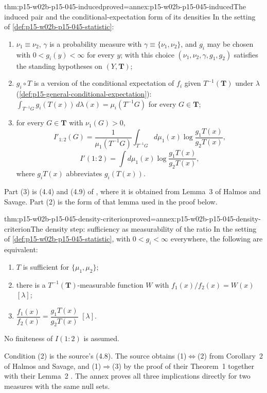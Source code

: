 \begin{hblemma}{thm:p15-w02b-p15-045-induced}{proved=annex:p15-w02b-p15-045-induced}{The induced pair and the conditional-expectation form of its densities}
In the setting of \cref{def:p15-w02b-p15-045-statistic}:
\begin{enumerate}
\item \(\nu_1\equiv\nu_2\), \(\gamma\) is a probability measure with
\(\gamma\equiv\{\nu_1,\nu_2\}\), and \(g_i\) may be chosen with
\(0<g_i(y)<\infty\) for every \(y\); with this choice
\((\nu_1,\nu_2,\gamma,g_1,g_2)\) satisfies the standing hypotheses on
\((Y,\mathbf T)\);
\item \(g_i\circ T\) is a version of the conditional expectation of
\(f_i\) given \(T^{-1}(\mathbf T)\) under \(\lambda\)
(\cref{def:p15-general-conditional-expectation}):
\(\int_{T^{-1}G}g_i(T(x))\,d\lambda(x)=\mu_i(T^{-1}G)\) for every
\(G\in\mathbf T\);
\item for every \(G\in\mathbf T\) with \(\nu_1(G)>0\),
\[
  I'_{1:2}(G)=\frac1{\mu_1(T^{-1}G)}\int_{T^{-1}G}d\mu_1(x)\log\frac{g_1T(x)}{g_2T(x)},
\]
\[
  I'(1:2)=\int d\mu_1(x)\log\frac{g_1T(x)}{g_2T(x)},
\]
where \(g_iT(x)\) abbreviates \(g_i(T(x))\).
\end{enumerate}
\end{hblemma}

Part (3) is (4.4) and (4.9) of
\cite[pp.~83--84]{KullbackLeibler1951Information}, where it is obtained
from Lemma~3 of Halmos and Savage. Part (2) is the form of that lemma
used in the proof below.

\begin{hblemma}{thm:p15-w02b-p15-045-density-criterion}{proved=annex:p15-w02b-p15-045-density-criterion}{The density step: sufficiency as measurability of the ratio}
In the setting of \cref{def:p15-w02b-p15-045-statistic}, with
\(0<g_i<\infty\) everywhere, the following are equivalent:
\begin{enumerate}
\item \(T\) is sufficient for \(\{\mu_1,\mu_2\}\);
\item there is a \(T^{-1}(\mathbf T)\)-measurable function \(W\) with
\(f_1(x)/f_2(x)=W(x)\) \([\lambda]\);
\item \(\dfrac{f_1(x)}{f_2(x)}=\dfrac{g_1T(x)}{g_2T(x)}\) \([\lambda]\).
\end{enumerate}
No finiteness of \(I(1:2)\) is assumed.
\end{hblemma}

Condition (2) is the source's (4.8). The source obtains (1)\(\Leftrightarrow\)(2)
from Corollary~2 of Halmos and Savage, and (1)\(\Rightarrow\)(3) by
the proof of their Theorem~1 together with their Lemma~2
\cite[p.~84]{KullbackLeibler1951Information}. The annex proves all
three implications directly for two measures with the same null sets.

